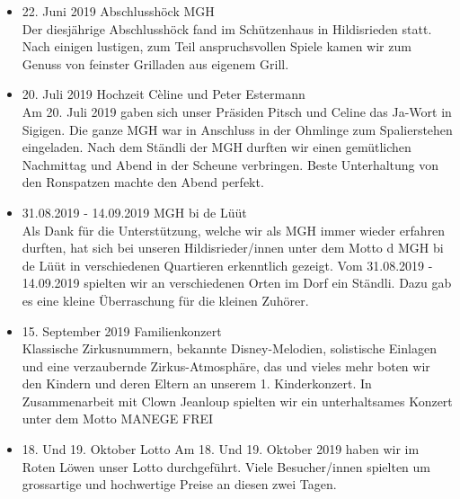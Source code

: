 \begin{history}
\begin{itemize}
        \item 22. Juni 2019 Abschlusshöck MGH\\
              Der diesjährige Abschlusshöck fand im Schützenhaus in Hildisrieden
              statt. Nach einigen lustigen, zum Teil anspruchsvollen Spiele
              kamen wir zum Genuss von feinster Grilladen aus eigenem Grill.

        \item 20. Juli 2019 Hochzeit Cèline und Peter Estermann\\
              Am 20. Juli 2019 gaben sich unser Präsiden Pitsch und Celine das
              Ja-Wort in Sigigen. Die ganze MGH war in Anschluss in der Ohmlinge
              zum Spalierstehen eingeladen. Nach dem Ständli der MGH durften wir
              einen gemütlichen Nachmittag und Abend in der Scheune verbringen.
              Beste Unterhaltung von den Ronspatzen machte den Abend perfekt.

        \item 31.08.2019 - 14.09.2019 MGH bi de Lüüt\\
              Als Dank für die Unterstützung, welche wir als MGH immer wieder
              erfahren durften, hat sich bei unseren Hildisrieder/innen unter
              dem Motto d MGH bi de Lüüt in verschiedenen Quartieren erkenntlich
              gezeigt. Vom 31.08.2019 - 14.09.2019 spielten wir an verschiedenen
              Orten im Dorf ein Ständli. Dazu gab es eine kleine Überraschung
              für die kleinen Zuhörer.

        \item 15. September 2019 Familienkonzert\\
              Klassische Zirkusnummern, bekannte Disney-Melodien, solistische
              Einlagen und eine verzaubernde Zirkus-Atmosphäre, das und vieles
              mehr boten wir den Kindern und deren Eltern an unserem 1.
              Kinderkonzert. In Zusammenarbeit mit Clown Jeanloup spielten wir
              ein unterhaltsames Konzert unter dem Motto MANEGE FREI

        \item  18. Und 19. Oktober Lotto Am 18. Und 19. Oktober 2019 haben wir
              im Roten Löwen unser Lotto durchgeführt. Viele Besucher/innen
              spielten um grossartige und hochwertige Preise an diesen zwei
              Tagen.

    \end{itemize}

\end{history}
